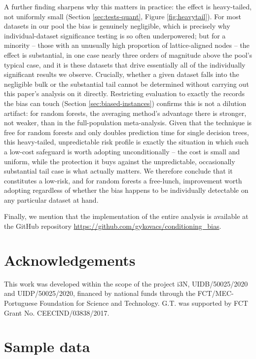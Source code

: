 \documentclass[5p,twocolumn,authoryear]{elsarticle}
\theoremstyle{plain}%
\theoremstyle{remark}%
\theoremstyle{definition}%
\begin{document}
A further finding sharpens why this matters in practice: the effect is heavy-tailed, not uniformly small (Section \ref{sec:tests-quant}, Figure \ref{fig:heavytail}). For most datasets in our pool the bias is genuinely negligible, which is precisely why individual-dataset significance testing is so often underpowered; but for a minority -- those with an unusually high proportion of lattice-aligned nodes -- the effect is substantial, in one case nearly three orders of magnitude above the pool's typical case, and it is these datasets that drive essentially all of the individually significant results we observe. Crucially, whether a given dataset falls into the negligible bulk or the substantial tail cannot be determined without carrying out this paper's analysis on it directly. Restricting evaluation to exactly the records the bias can touch (Section \ref{sec:biased-instances}) confirms this is not a dilution artifact: for random forests, the averaging method's advantage there is stronger, not weaker, than in the full-population meta-analysis. Given that the technique is free for random forests and only doubles prediction time for single decision trees, this heavy-tailed, unpredictable risk profile is exactly the situation in which such a low-cost safeguard is worth adopting unconditionally -- the cost is small and uniform, while the protection it buys against the unpredictable, occasionally substantial tail case is what actually matters. We therefore conclude that it constitutes a low-risk, and for random forests a free-lunch, improvement worth adopting regardless of whether the bias happens to be individually detectable on any particular dataset at hand.

Finally, we mention that the implementation of the entire analysis is available at the GitHub repository \url{https://github.com/gykovacs/conditioning_bias}.

\section*{Acknowledgements}

This work was developed within the scope of the project
i3N, UIDB/50025/2020 and UIDP/50025/2020, financed by
national funds through the FCT/MEC-Portuguese Foundation for Science and Technology. G.T. was supported by FCT
Grant No. CEECIND/03838/2017.

\appendix

    \section{Sample data}
    \label{sec:sample}
\end{document}
